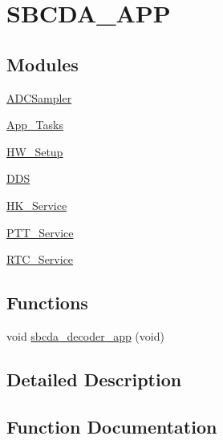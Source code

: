 \hypertarget{group___s_b_c_d_a___a_p_p}{}\section{S\+B\+C\+D\+A\+\_\+\+A\+PP}
\label{group___s_b_c_d_a___a_p_p}
\subsection*{Modules}
\begin{DoxyCompactItemize}
\item 
\hyperlink{group___a_d_c_sampler}{A\+D\+C\+Sampler}
\item 
\hyperlink{group___app___tasks}{App\+\_\+\+Tasks}
\item 
\hyperlink{group___h_w___setup}{H\+W\+\_\+\+Setup}
\item 
\hyperlink{group___d_d_s}{D\+DS}
\item 
\hyperlink{group___h_k___service}{H\+K\+\_\+\+Service}
\item 
\hyperlink{group___p_t_t___service}{P\+T\+T\+\_\+\+Service}
\item 
\hyperlink{group___r_t_c___service}{R\+T\+C\+\_\+\+Service}
\end{DoxyCompactItemize}
\subsection*{Functions}
\begin{DoxyCompactItemize}
\item 
void \hyperlink{group___s_b_c_d_a___a_p_p_gad2def83dd6929f8238ab553eed422d73}{sbcda\+\_\+decoder\+\_\+app} (void)
\end{DoxyCompactItemize}


\subsection{Detailed Description}


\subsection{Function Documentation}
\mbox{\label{group___s_b_c_d_a___a_p_p_gad2def83dd6929f8238ab553eed422d73}} 
